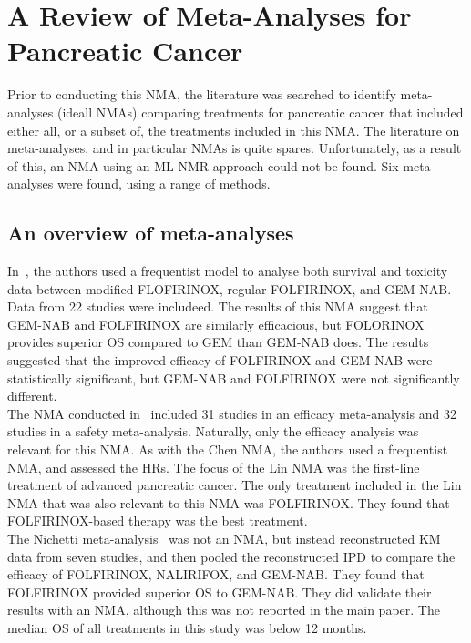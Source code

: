 \chapter{A Review of Meta-Analyses for Pancreatic Cancer}\label{litChap}

Prior to conducting this NMA, the literature was searched to identify meta-analyses (ideall NMAs) comparing treatments for pancreatic cancer that included either all, or a subset of, the treatments included in this NMA. The literature on meta-analyses, and in particular NMAs is quite spares. Unfortunately, as a result of this, an NMA using an ML-NMR approach could not be found. Six meta-analyses were found, using a range of methods.

\section{An overview of meta-analyses}
In~\cite{chen}, the authors used a frequentist model to analyse both survival and toxicity data between modified FLOFIRINOX, regular FOLFIRINOX, and GEM-NAB. Data from 22 studies were includeed. The results of this NMA suggest that GEM-NAB and FOLFIRINOX are similarly efficacious, but FOLORINOX provides superior OS compared to GEM than GEM-NAB does. The results suggested that the improved efficacy of FOLFIRINOX and GEM-NAB were statistically significant, but GEM-NAB and FOLFIRINOX were not significantly different. \\

The NMA conducted in~\cite{lin} included 31 studies in an efficacy meta-analysis and 32 studies in a safety meta-analysis. Naturally, only the efficacy analysis was relevant for this NMA. As with the Chen NMA, the authors used a frequentist NMA, and assessed the HRs. The focus of the Lin NMA was the first-line treatment of advanced pancreatic cancer. The only treatment included in the Lin NMA that was also relevant to this NMA was FOLFIRINOX. They found that FOLFIRINOX-based therapy was the best treatment. \\

The Nichetti meta-analysis~\cite{nichetti} was not an NMA, but instead reconstructed KM data from seven studies, and then pooled the reconstructed IPD to compare the efficacy of FOLFIRINOX, NALIRIFOX, and GEM-NAB. They found that FOLFIRINOX provided superior OS to GEM-NAB. They did validate their results with an NMA, although this was not reported in the main paper. The median OS of all treatments in this study was below 12 months. \\

